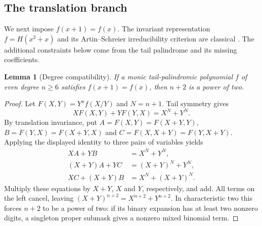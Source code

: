 \documentclass[11pt]{article}
\newtheorem{lemma}[proposition]{Lemma}
\theoremstyle{definition}
\theoremstyle{remark}
\begin{document}
\subsection{The translation branch}\label{sec:translation}
We next impose $f(x+1)=f(x)$. The invariant representation
$f=H(x^2+x)$ and its Artin--Schreier irreducibility criterion are
classical \cite[Lemma 2.1 and Theorem 2.2]{Kap17}. The additional
constraints below come from the tail palindrome and its missing
coefficients.

\begin{lemma}[Degree compatibility]\label{lem:translation-degree}
If a monic tail-palindromic polynomial $f$ of even degree $n\ge6$
satisfies $f(x+1)=f(x)$, then $n+2$ is a power of two.
\end{lemma}
\begin{proof}
Let $F(X,Y)=Y^nf(X/Y)$ and $N=n+1$. Tail symmetry gives
\[
 XF(X,Y)+YF(Y,X)=X^N+Y^N.
\]
By translation invariance, put
$A=F(X,Y)=F(X+Y,Y)$, $B=F(Y,X)=F(X+Y,X)$ and
$C=F(X,X+Y)=F(Y,X+Y)$. Applying the displayed identity to
three pairs of variables yields
\[
\begin{aligned}
 XA+YB&=X^N+Y^N,\\
 (X+Y)A+YC&=(X+Y)^N+Y^N,\\
 XC+(X+Y)B&=X^N+(X+Y)^N.
\end{aligned}
\]
Multiply these equations by $X+Y$, $X$ and $Y$, respectively,
and add. All terms on the left cancel, leaving
$(X+Y)^{n+2}=X^{n+2}+Y^{n+2}$. In characteristic two this
forces $n+2$ to be a power of two: if its binary expansion has
at least two nonzero digits, a singleton proper submask gives
a nonzero mixed binomial term.
\end{proof}
\end{document}
